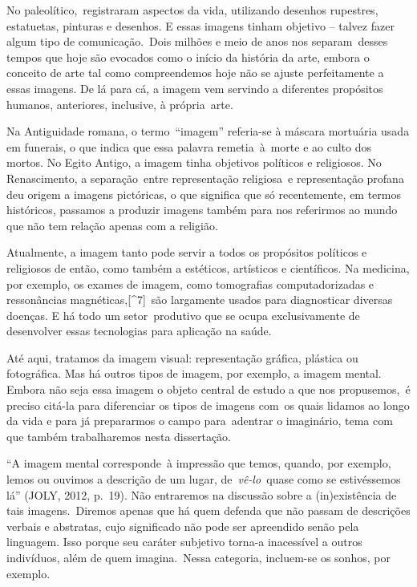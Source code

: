 \documentclass[
  letterpaper,
  a4paper,
  12pt]{scrbook}
\begin{document}
No paleolítico,~registraram aspectos da vida, utilizando desenhos
rupestres, estatuetas, pinturas e desenhos. E essas imagens tinham
objetivo -- talvez fazer algum tipo de comunicação.~Dois milhões e meio
de anos nos separam~desses tempos que hoje são evocados como o início da
história da arte, embora o conceito de arte tal como compreendemos hoje
não se ajuste perfeitamente a essas imagens. De lá para cá, a imagem vem
servindo a diferentes propósitos humanos, anteriores, inclusive, à
própria~arte.~

Na Antiguidade romana, o termo~``imagem'' referia-se à máscara mortuária
usada em funerais, o que indica que essa palavra remetia~à~morte e ao
culto dos mortos. No Egito Antigo, a imagem tinha objetivos políticos e
religiosos. No Renascimento, a separação~entre representação religiosa~e
representação profana deu origem a imagens pictóricas, o que significa
que só recentemente, em termos históricos, passamos a produzir imagens
também para nos referirmos ao mundo que não tem relação apenas com a
religião.

Atualmente, a imagem tanto pode servir a todos os propósitos políticos e
religiosos de então, como também a estéticos, artísticos e científicos.
Na medicina, por exemplo, os exames de imagem, como tomografias
computadorizadas e ressonâncias magnéticas,{[}\^{}7{]}~são largamente
usados para diagnosticar diversas doenças. E há todo um setor~produtivo
que se ocupa exclusivamente de desenvolver essas tecnologias para
aplicação na saúde.~

Até aqui, tratamos da imagem visual: representação gráfica, plástica ou
fotográfica. Mas há outros tipos de imagem, por exemplo, a imagem
mental. Embora não seja essa imagem o objeto central de estudo a que nos
propusemos,~é preciso citá-la para diferenciar os tipos de imagens
com~os quais lidamos ao longo da vida e para já prepararmos o campo
para~adentrar o imaginário, tema com que também trabalharemos nesta
dissertação.~

``A imagem mental corresponde~à impressão que temos, quando, por
exemplo, lemos ou ouvimos a descrição de um lugar, de~\emph{vê-lo~}quase
como se estivéssemos lá'' (JOLY, 2012, p.~19). Não entraremos na
discussão sobre a (in)existência de tais imagens.~Diremos apenas que há
quem defenda que não passam de descrições verbais e abstratas, cujo
significado não pode ser apreendido senão pela linguagem. Isso porque
seu caráter subjetivo torna-a inacessível a outros indivíduos, além de
quem imagina.~Nessa categoria, incluem-se os sonhos, por exemplo.~
\end{document}

